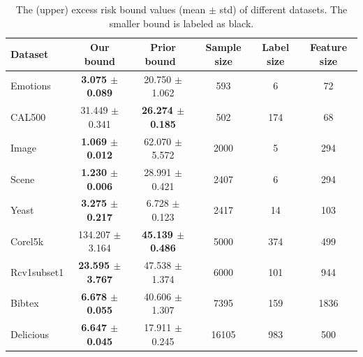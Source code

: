 \documentclass{article}
\begin{document}
\begin{table}
\caption{The (upper) excess risk bound values (mean $\pm$ std) of different datasets. The smaller bound is labeled as black.}
\label{table: upper bound of pa}
\centering
\begin{threeparttable} 
\begin{tabular}{lccccc}
    \toprule
    Dataset & Our bound &  Prior bound~\cite{wu2023macro-auc} & Sample size & Label size & Feature size  \\
    \midrule
    Emotions   & \textbf{3.075 $\pm$ 0.089}  & 20.750 $\pm$ 1.062  & 593 & 6 & 72 \\
    CAL500    & 31.449 $\pm$ 0.341 & \textbf{26.274 $\pm$ 0.185} & 502 & 174 & 68 \\
    Image    & \textbf{1.069 $\pm$ 0.012} & 62.070 $\pm$ 5.572  & 2000  & 5 & 294\\
    Scene    & \textbf{1.230 $\pm$ 0.006} & 28.991 $\pm$ 0.421    &   2407 & 6  & 294  \\
    Yeast    & \textbf{3.275 $\pm$ 0.217} & 6.728 $\pm$ 0.123  & 2417 & 14 & 103 \\
    Corel5k       & 134.207 $\pm$ 3.164 & \textbf{45.139 $\pm$ 0.486}  & 5000  & 374 & 499\\
    Rcv1subset1     & \textbf{23.595 $\pm$ 3.767}  & 47.538 $\pm$ 1.374 
     & 6000  & 101  & 944    \\
    Bibtex   & \textbf{6.678 $\pm$ 0.055} & 40.606 $\pm$ 1.307  & 7395 & 159 & 1836\\
    Delicious   & \textbf{6.647 $\pm$ 0.045} & 17.911 $\pm$ 0.245  & 16105 & 983 & 500\\
    \bottomrule
\end{tabular}
\end{threeparttable}
\end{table}
\end{document}
